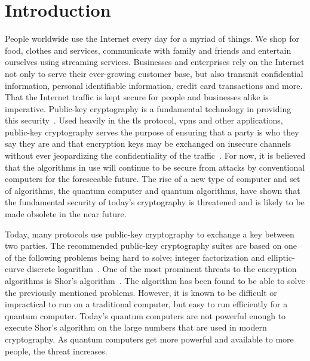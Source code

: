\chapter{Introduction}
\label{chapter:introduction}




People worldwide use the Internet every day for a myriad of things. We shop for food, clothes and services, communicate with family and friends and entertain ourselves using streaming services. Businesses and enterprises rely on the Internet not only to serve their ever-growing customer base, but also transmit confidential information, personal identifiable information, credit card transactions and more. That the Internet traffic is kept secure for people and businesses alike is imperative. Public-key cryptography is a fundamental technology in providing this security~\cite{rfc8446}. Used heavily in the \gls{tls} protocol, \glspl{vpn} and other applications, public-key cryptography serves the purpose of ensuring that a party is who they say they are and that encryption keys may be exchanged on insecure channels without ever jeopardizing the confidentiality of the traffic~\cite{rfc8446}. For now, it is believed that the algorithms in use will continue to be secure from attacks by conventional computers for the foreseeable future. The rise of a new type of computer and set of algorithms, the quantum computer and quantum algorithms, have shown that the fundamental security of today's cryptography is threatened and is likely to be made obsolete in the near future.

Today, many protocols use public-key cryptography to exchange a key between two parties. The recommended public-key cryptography suites are based on one of the following problems being hard to solve; integer factorization and elliptic-curve discrete logarithm~\cite{nsa2015, nist2019}. One of the most prominent threats to the encryption algorithms is Shor's algorithm~\cite{shor1997}. The algorithm has been found to be able to solve the previously mentioned problems. However, it is known to be difficult or impractical to run on a traditional computer, but easy to run efficiently for a quantum computer. Today's quantum computers are not powerful enough to execute Shor's algorithm on the large numbers that are used in modern cryptography. As quantum computers get more powerful and available to more people, the threat increases.

